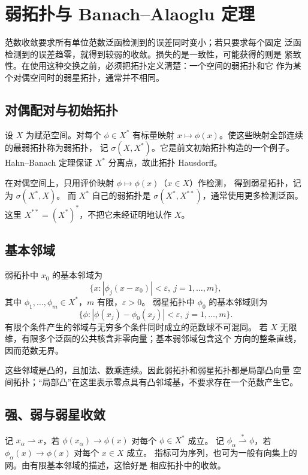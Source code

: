 \chapter{弱拓扑与 Banach--Alaoglu 定理}
\label{chap:weak-topologies}

范数收敛要求所有单位范数泛函检测到的误差同时变小；若只要求每个固定
泛函检测到的误差趋零，就得到较弱的收敛。损失的是一致性，可能获得的则是
紧致性。在使用这种交换之前，必须把拓扑定义清楚：一个空间的弱拓扑和它
作为某个对偶空间时的弱星拓扑，通常并不相同。

\section{对偶配对与初始拓扑}

设 \(X\) 为赋范空间。对每个 \(\phi\in X^*\) 有标量映射
\(x\mapsto\phi(x)\)。使这些映射全部连续的最弱拓扑称为弱拓扑，
记 \(\sigma(X,X^*)\)。它是前文初始拓扑构造的一个例子。
Hahn--Banach 定理保证 \(X^*\) 分离点，故此拓扑 Hausdorff。

在对偶空间上，只用评价映射 \(\phi\mapsto\phi(x)\)（\(x\in X\)）作检测，
得到弱星拓扑，记为 \(\sigma(X^*,X)\)。
而 \(X^*\) 自己的弱拓扑是 \(\sigma(X^*,X^{**})\)，通常使用更多检测泛函。
这里 \(X^{**}=(X^*)^*\)，不把它未经证明地认作 \(X\)。

\section{基本邻域}

弱拓扑中 \(x_0\) 的基本邻域为
\[
 \{x:|\phi_j(x-x_0)|<\varepsilon,\ j=1,\ldots,m\},
\]
其中 \(\phi_1,\ldots,\phi_m\in X^*\)，\(m\) 有限，\(\varepsilon>0\)。
弱星拓扑中 \(\phi_0\) 的基本邻域则为
\[
 \{\phi:|\phi(x_j)-\phi_0(x_j)|<\varepsilon,\ j=1,\ldots,m\}.
\]
有限个条件产生的邻域与无穷多个条件同时成立的范数球不可混同。
若 \(X\) 无限维，有限多个泛函的公共核含非零向量；基本弱邻域包含这个
方向的整条直线，因而范数无界。

这些邻域是凸的，且加法、数乘连续。因此弱拓扑和弱星拓扑都是局部凸向量
空间拓扑；“局部凸”在这里表示零点具有凸邻域基，不要求存在一个范数产生它。

\section{强、弱与弱星收敛}

记 \(x_\alpha\rightharpoonup x\)，若
\(\phi(x_\alpha)\to\phi(x)\) 对每个 \(\phi\in X^*\) 成立。
记 \(\phi_\alpha\overset{*}{\rightharpoonup}\phi\)，若
\(\phi_\alpha(x)\to\phi(x)\) 对每个 \(x\in X\) 成立。
指标可为序列，也可为一般有向集上的网。由有限基本邻域的描述，这恰好是
相应拓扑中的收敛。

